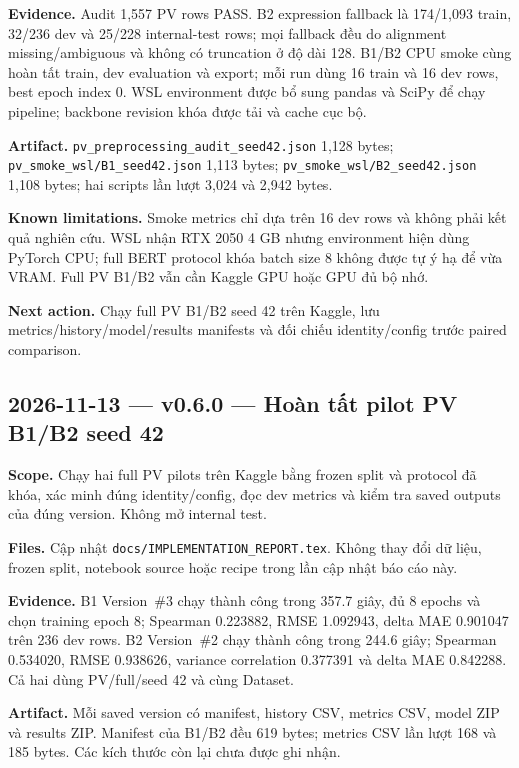 \documentclass[11pt,a4paper]{article}
\newcommand{\code}[1]{\nolinkurl{#1}}
\begin{document}
\textbf{Evidence.} Audit 1,557 PV rows PASS. B2 expression fallback là 174/1,093 train, 32/236 dev và 25/228 internal-test rows; mọi fallback đều do alignment missing/ambiguous và không có truncation ở độ dài 128. B1/B2 CPU smoke cùng hoàn tất train, dev evaluation và export; mỗi run dùng 16 train và 16 dev rows, best epoch index 0. WSL environment được bổ sung pandas và SciPy để chạy pipeline; backbone revision khóa được tải và cache cục bộ.

\textbf{Artifact.} \code{pv_preprocessing_audit_seed42.json} 1,128 bytes; \code{pv_smoke_wsl/B1_seed42.json} 1,113 bytes; \code{pv_smoke_wsl/B2_seed42.json} 1,108 bytes; hai scripts lần lượt 3,024 và 2,942 bytes.

\textbf{Known limitations.} Smoke metrics chỉ dựa trên 16 dev rows và không phải kết quả nghiên cứu. WSL nhận RTX 2050 4 GB nhưng environment hiện dùng PyTorch CPU; full BERT protocol khóa batch size 8 không được tự ý hạ để vừa VRAM. Full PV B1/B2 vẫn cần Kaggle GPU hoặc GPU đủ bộ nhớ.

\textbf{Next action.} Chạy full PV B1/B2 seed 42 trên Kaggle, lưu metrics/history/model/results manifests và đối chiếu identity/config trước paired comparison.

\subsection*{2026-11-13 --- v0.6.0 --- Hoàn tất pilot PV B1/B2 seed 42}

\textbf{Scope.} Chạy hai full PV pilots trên Kaggle bằng frozen split và protocol đã khóa, xác minh đúng identity/config, đọc dev metrics và kiểm tra saved outputs của đúng version. Không mở internal test.

\textbf{Files.} Cập nhật \code{docs/IMPLEMENTATION_REPORT.tex}. Không thay đổi dữ liệu, frozen split, notebook source hoặc recipe trong lần cập nhật báo cáo này.

\textbf{Evidence.} B1 Version~\#3 chạy thành công trong 357.7 giây, đủ 8 epochs và chọn training epoch 8; Spearman 0.223882, RMSE 1.092943, delta MAE 0.901047 trên 236 dev rows. B2 Version~\#2 chạy thành công trong 244.6 giây; Spearman 0.534020, RMSE 0.938626, variance correlation 0.377391 và delta MAE 0.842288. Cả hai dùng PV/full/seed 42 và cùng Dataset.

\textbf{Artifact.} Mỗi saved version có manifest, history CSV, metrics CSV, model ZIP và results ZIP. Manifest của B1/B2 đều 619 bytes; metrics CSV lần lượt 168 và 185 bytes. Các kích thước còn lại chưa được ghi nhận.
\end{document}
